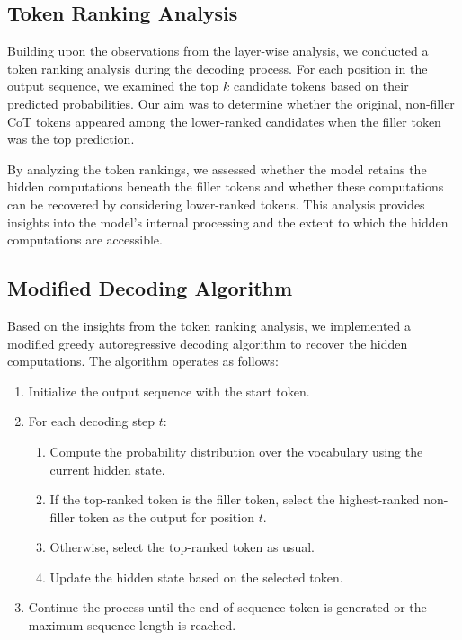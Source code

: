 \documentclass{article}
\begin{document}
\subsection{Token Ranking Analysis}

Building upon the observations from the layer-wise analysis, we conducted a token ranking analysis during the decoding process. For each position in the output sequence, we examined the top $k$ candidate tokens based on their predicted probabilities. Our aim was to determine whether the original, non-filler CoT tokens appeared among the lower-ranked candidates when the filler token was the top prediction.

By analyzing the token rankings, we assessed whether the model retains the hidden computations beneath the filler tokens and whether these computations can be recovered by considering lower-ranked tokens. This analysis provides insights into the model's internal processing and the extent to which the hidden computations are accessible.

\subsection{Modified Decoding Algorithm}

Based on the insights from the token ranking analysis, we implemented a modified greedy autoregressive decoding algorithm to recover the hidden computations. The algorithm operates as follows:

\begin{enumerate}
    \item Initialize the output sequence with the start token.
    \item For each decoding step $t$:
    \begin{enumerate}
        \item Compute the probability distribution over the vocabulary using the current hidden state.
        \item If the top-ranked token is the filler token, select the highest-ranked non-filler token as the output for position $t$.
        \item Otherwise, select the top-ranked token as usual.
        \item Update the hidden state based on the selected token.
    \end{enumerate}
    \item Continue the process until the end-of-sequence token is generated or the maximum sequence length is reached.
\end{enumerate}
\end{document}
